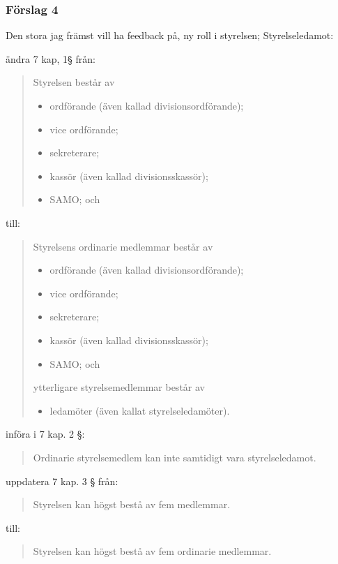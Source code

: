 \documentclass[protokoll]{dvd}
\begin{document}
\subsubsection*{Förslag 4}
Den stora jag främst vill ha feedback på, ny roll i styrelsen; Styrelseledamot:
\begin{attsatser}
    \item ändra 7 kap, 1§ från:
    \begin{quote}
    Styrelsen består av
		\begin{itemize}
			\item ordförande (även kallad divisionsordförande);
			\item vice ordförande;
			\item sekreterare;
			\item kassör (även kallad divisionsskassör);
			\item SAMO; och
            \end{itemize}
    \end{quote}
    till:
    \begin{quote}
        Styrelsens ordinarie medlemmar består av 
		\begin{itemize}
			\item ordförande (även kallad divisionsordförande);
			\item vice ordförande;
			\item sekreterare;
			\item kassör (även kallad divisionsskassör);
			\item SAMO; och
            \end{itemize}
            ytterligare styrelsemedlemmar består av
            \begin{itemize}
                \item ledamöter (även kallat    styrelseledamöter).
            \end{itemize}
    \end{quote}
    
    \item införa i 7 kap. 2 §:
    \begin{quote}
        Ordinarie styrelsemedlem kan inte samtidigt vara styrelseledamot.
    \end{quote}
    
    \item uppdatera 7 kap. 3 § från:
    \begin{quote}
        Styrelsen kan högst bestå av fem medlemmar.
    \end{quote}
    till: 
    \begin{quote}
        Styrelsen kan högst bestå av fem ordinarie medlemmar. 
    \end{quote}
    

\end{attsatser}
\end{document}
